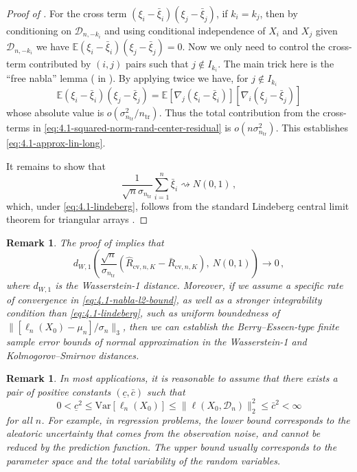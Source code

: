 \documentclass[11pt]{article}
\theoremstyle{plain}
\newtheorem{remark}[theorem]{Remark}
\newcommand{\cv}{{\mathrm{cv}}}
\newcommand{\tr}{{\mathrm{tr}}}
\newcommand{\D}{{\mathcal{D}}}
\newcommand{\var}{\mathrm{Var}}
\begin{document}
\begin{proof}[Proof of ]
For the cross term $(\xi_i-\bar\xi_i)(\xi_j-\bar\xi_j)$, if $k_i=k_j$, then by conditioning on $\D_{n,-k_i}$ and using conditional independence of $X_i$ and $X_j$ given $\D_{n,-k_i}$ we have
$\mathbb E(\xi_i-\bar\xi_i)(\xi_j-\bar\xi_j)=0$. Now we only need to control the cross-term contributed by $(i,j)$ pairs such that $j\notin I_{k_i}$.  The main trick here is the ``free nabla'' lemma ( in ).  By applying  twice we have, for $j\notin I_{k_i}$
$$
\mathbb E(\xi_i-\bar\xi_i)(\xi_j-\bar \xi_j) = \mathbb E [\nabla_j(\xi_i-\bar\xi_i)][\nabla_i(\xi_j-\bar\xi_j)]
$$
whose absolute value is $o(\sigma_{n_\tr}^2/n_\tr)$. Thus the total contribution from the cross-terms in \eqref{eq:4.1-squared-norm-rand-center-residual} is  $o(n\sigma_{n_\tr}^2)$.  This establishes \eqref{eq:4.1-approx-lin-long}.

It remains to show that 
$$\frac{1}{\sqrt{n}\sigma_{n_\tr}}\sum_{i=1}^n\bar\xi_i\rightsquigarrow N(0,1)\,,$$
which, under \eqref{eq:4.1-lindeberg}, follows from the standard Lindeberg central limit theorem for triangular arrays \citep[Theorem 3.4.5]{durrett2019probability}.
\end{proof}

\begin{remark}\label{rem:4.1-wasserstein}
The proof of  implies that 
    $$
    d_{W,1}\left(\frac{\sqrt{n}}{\sigma_{n_\tr}}\left(\hat R_{\cv,n,K}-\bar R_{\cv,n,K}\right),~N(0,1)\right)\rightarrow 0\,,
    $$
    where $d_{W,1}$ is the Wasserstein-1 distance.
Moreover, if we assume a specific rate of convergence in \eqref{eq:4.1-nabla-l2-bound}, as well as a stronger integrability condition than \eqref{eq:4.1-lindeberg}, such as uniform boundedness of $\|[\ell_n(X_0)-\mu_n]/\sigma_n\|_3$, then we can establish the Berry–Esseen-type finite sample error bounds of normal approximation in the Wasserstein-1 and Kolmogorov–Smirnov distances.
\end{remark}

\begin{remark}\label{rem:4.1-var-lower-bound}
In most applications, it is reasonable to assume that there exists a pair of positive constants $(\underline{c},\bar c)$ such that
\begin{equation}\label{eq:4.1-var-lower}
0< \underline{c}^2\le \var[\ell_n(X_0)]\le \|\ell(X_0,\D_n)\|_2^2\le \bar c^2<\infty
\end{equation}
for all $n$.  For example, in regression problems, the lower bound corresponds to the aleatoric uncertainty that comes from the observation noise, and cannot be reduced by the prediction function. The upper bound usually corresponds to the parameter space and the total variability of the random variables.
\end{remark}
\end{document}
